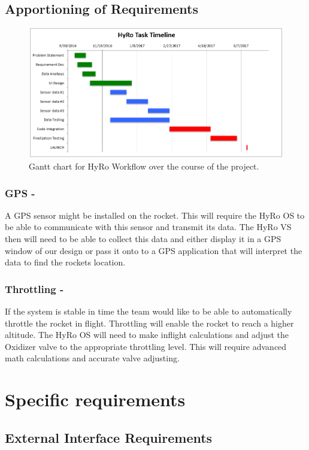 \documentclass[10pt,draftclsnofoot,onecolumn,compsoc]{IEEEtran}
\begin{document}
\subsection{Apportioning of Requirements}
\begin{figure}
  \caption{Gantt chart for HyRo Workflow over the course of the project.}
  \centering
	\includegraphics[scale=.75]{GanntChart}
\end{figure}
\FloatBarrier
\subsubsection{\bf GPS -} A GPS sensor might be installed on the rocket. This will require the HyRo OS to be able to communicate with this sensor and transmit its data. The HyRo VS then will need to be able to collect this data and either display it in a GPS window of our design or pass it onto to a GPS application that will interpret the data to find the rockets location.
\subsubsection{\bf Throttling -} If the system is stable in time the team would like to be able to automatically throttle the rocket in flight. Throttling will enable the rocket to reach a higher altitude. The HyRo OS will need to make inflight calculations and adjust the Oxidizer valve to the appropriate throttling level. This will require advanced math calculations and accurate valve adjusting.

\section{ Specific requirements}
\subsection{External Interface Requirements}
\end{document}
